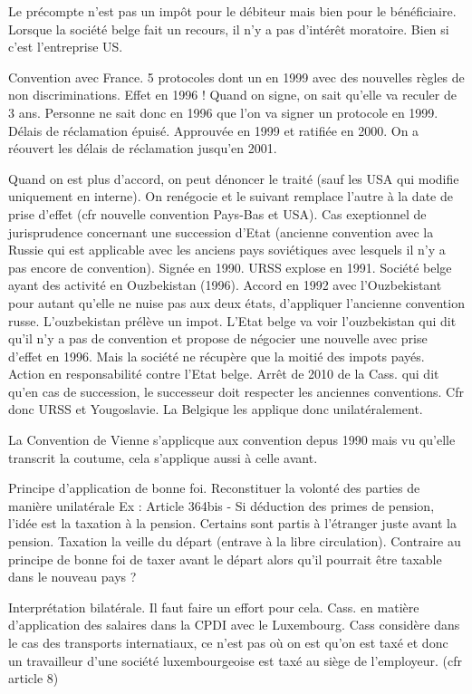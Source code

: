 \documentclass{book}
\begin{document}
Le précompte n’est pas un impôt pour le débiteur mais bien pour le bénéficiaire. Lorsque la société belge fait un recours, il n’y a pas d’intérêt moratoire. Bien si c’est l’entreprise US.

Convention avec France. 5 protocoles dont un en 1999 avec des nouvelles règles de non discriminations. Effet en 1996 ! Quand on signe, on sait qu’elle va reculer de 3 ans. Personne ne sait donc en 1996 que l’on va signer un protocole en 1999. Délais de réclamation épuisé. Approuvée en 1999 et ratifiée en 2000. On a réouvert les délais de réclamation jusqu’en 2001.

Quand on est plus d’accord, on peut dénoncer le traité (sauf les USA qui modifie uniquement en interne). On renégocie et le suivant remplace l’autre à la date de prise d’effet (cfr nouvelle convention Pays-Bas et USA). Cas exeptionnel de jurisprudence concernant une succession d’Etat (ancienne convention avec la Russie qui est applicable avec les anciens pays soviétiques avec lesquels il n’y a pas encore de convention). Signée en 1990. URSS explose en 1991. Société belge ayant des activité en Ouzbekistan (1996). Accord en 1992 avec l’Ouzbekistant pour autant qu’elle ne nuise pas aux deux états, d’appliquer l’ancienne convention russe. L’ouzbekistan prélève un impot. L’Etat belge va voir l’ouzbekistan qui dit qu’il n’y a pas de convention et propose de négocier une nouvelle avec prise d’effet en 1996. Mais la société ne récupère que la moitié des impots payés. Action en responsabilité contre l’Etat belge. Arrêt de 2010 de la Cass. qui dit qu’en cas de succession, le successeur doit respecter les anciennes conventions. Cfr donc URSS et Yougoslavie. La Belgique les applique donc unilatéralement.

La Convention de Vienne s’applicque aux convention depus 1990 mais vu qu’elle transcrit la coutume, cela s’applique aussi à celle avant.

Principe d’application de bonne foi. Reconstituer la volonté des parties de manière unilatérale
Ex : Article 364bis - Si déduction des primes de pension, l’idée est la taxation à la pension. Certains sont partis à l’étranger juste avant la pension. Taxation la veille du départ (entrave à la libre circulation). Contraire au principe de bonne foi de taxer avant le départ alors qu’il pourrait être taxable dans le nouveau pays ?

Interprétation bilatérale. Il faut faire un effort pour cela. Cass. en matière d’application des salaires dans la CPDI avec le Luxembourg. Cass considère dans le cas des transports internatiaux, ce n’est pas où on est qu’on est taxé et donc un travailleur d’une société luxembourgeoise est taxé au siège de l’employeur. (cfr article 8)
\end{document}
